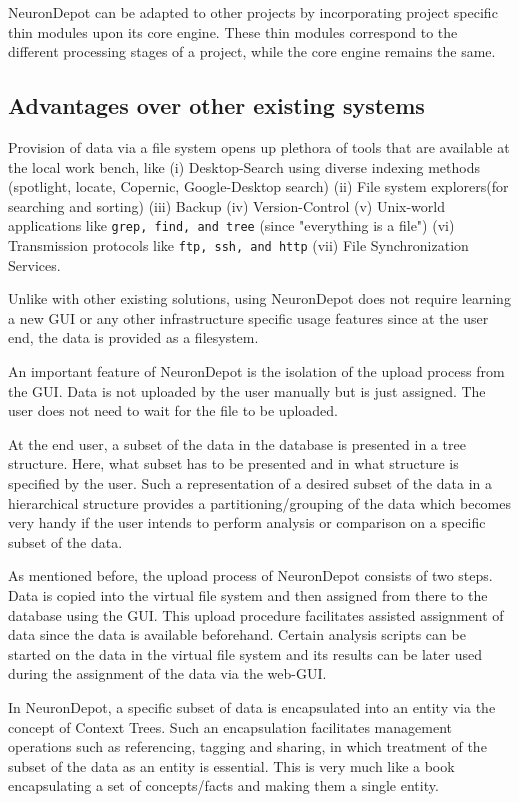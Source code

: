 \documentclass{frontiersSCNS} %
\begin{document}
NeuronDepot can be adapted to other projects by incorporating project specific
thin modules upon its core engine. These thin modules correspond to the
different processing stages of a project, while the core engine
remains the same.

\subsection{Advantages over other existing systems}

Provision of data via a file system opens up plethora of tools that are
available at the local work bench, like (i) Desktop-Search using diverse
indexing methods (spotlight, locate, Copernic, Google-Desktop search) (ii) File
system explorers(for  searching and sorting) (iii) Backup (iv) Version-Control
(v) Unix-world applications like \texttt{grep, find, and tree} (since
"everything is a file") (vi) Transmission protocols like \texttt{ftp, ssh, and
http} (vii) File Synchronization Services.

Unlike with other existing solutions, using NeuronDepot does not require
learning a new GUI or any other infrastructure specific usage features since at
the user end, the data is provided as  a filesystem.

An important feature of NeuronDepot is the isolation of the upload process from
the GUI. Data is not uploaded by the user manually but is just assigned. The
user does not need to wait for the file to be uploaded.

At the end user, a subset of the data in the database is presented in a tree
structure. Here, what subset has to be presented and in what structure is
specified by the user. Such a representation of a desired subset of the data in
a hierarchical structure provides a partitioning/grouping of the data which
becomes very handy if the user intends to perform analysis or comparison on a
specific subset of the data.

As mentioned before, the upload process of NeuronDepot consists of two steps.
Data is copied into the virtual file system and then assigned from there to the
database using the GUI. This upload procedure facilitates assisted assignment
of data since the data is available beforehand. Certain analysis scripts can be
started on the data in the virtual file system and its results can be later
used during the assignment of the data via the web-GUI.

In NeuronDepot, a specific subset of data is encapsulated into an entity via
the concept of Context Trees. Such an encapsulation facilitates management
operations such as referencing, tagging and sharing, in which treatment of the
subset of the data as an entity is essential. This is very much like a book
encapsulating a set of concepts/facts and making them a single entity.
\end{document}
